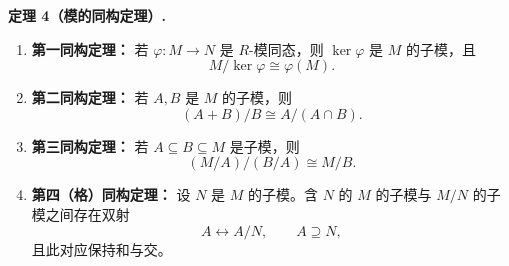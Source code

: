 \noindent\textbf{定理 4（模的同构定理）.}
\begin{enumerate}[label=(\arabic*)]
	\item \textbf{第一同构定理：} 若 $\varphi:M\to N$ 是 $R$-模同态，则 $\ker\varphi$ 是 $M$ 的子模，且
	\[
	M/\ker\varphi\cong \varphi(M).
	\]
	\item \textbf{第二同构定理：} 若 $A,B$ 是 $M$ 的子模，则
	\[
	(A+B)/B\cong A/(A\cap B).
	\]
	\item \textbf{第三同构定理：} 若 $A\subseteq B\subseteq M$ 是子模，则
	\[
	(M/A)/(B/A)\cong M/B.
	\]
	\item \textbf{第四（格）同构定理：} 设 $N$ 是 $M$ 的子模。含 $N$ 的 $M$ 的子模与 $M/N$ 的子模之间存在双射
	\[
	A\longleftrightarrow A/N,
	\qquad A\supseteq N,
	\]
	且此对应保持和与交。
\end{enumerate}


